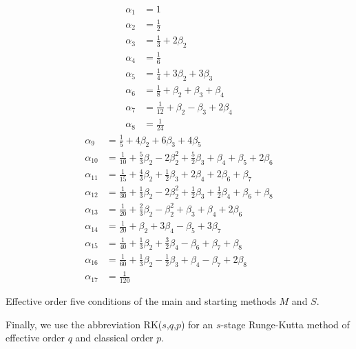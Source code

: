 \begin{table}
	\begin{multicols}{2}
		\begin{align*}
    		\alpha_1  &= 1 \\
     		\alpha_2  &= \tfrac{1}{2} \\
    		\alpha_3  &= \tfrac{1}{3} + 2\beta_2 \\
    		\alpha_4  &= \tfrac{1}{6} \\
    		\alpha_5  &= \tfrac{1}{4} + 3\beta_2 + 3\beta_3 \\
    		\alpha_6  &= \tfrac{1}{8} + \beta_2 + \beta_3 + \beta_4 \\
    		\alpha_7  &= \tfrac{1}{12} +\beta_2 - \beta_3 + 2\beta_4 \\
    		\alpha_8  &= \tfrac{1}{24}
    	\end{align*}
    	\vfill
    	\columnbreak
    	\begin{align*}
    		\alpha_9  &= \tfrac{1}{5} + 4\beta_2 + 6\beta_3 + 4\beta_5 \\
    		\alpha_{10} &= \tfrac{1}{10} + \tfrac{5}{3}\beta_2 - 2\beta_2^{2} + \tfrac{5}{2}\beta_3 + \beta_4 + \beta_5 + 2\beta_6 \\
    		\alpha_{11} &= \tfrac{1}{15} + \tfrac{4}{3}\beta_2 + \tfrac{1}{2}\beta_3 + 2\beta_4 + 2\beta_6 + \beta_7 \\
    		\alpha_{12} &= \tfrac{1}{30} + \tfrac{1}{3}\beta_2 - 2\beta_2^{2} + \tfrac{1}{2}\beta_3 + \tfrac{1}{2}\beta_4 + \beta_6 + \beta_8 \\
    		\alpha_{13} &= \tfrac{1}{20} + \tfrac{2}{3}\beta_2 - \beta_2^{2} + \beta_3 + \beta_4 + 2\beta_6 \\
    		\alpha_{14} &= \tfrac{1}{20} + \beta_2 + 3\beta_4 - \beta_5 + 3\beta_7 \\
    		\alpha_{15} &= \tfrac{1}{40} + \tfrac{1}{3}\beta_2 + \tfrac{3}{2}\beta_4 - \beta_6 + \beta_7 + \beta_8 \\
    		\alpha_{16} &= \tfrac{1}{60} + \tfrac{1}{3}\beta_2 - \tfrac{1}{2}\beta_3 + \beta_4 - \beta_7 + 2\beta_8 \\
    		\alpha_{17} &= \tfrac{1}{120}
    	\end{align*}
        \vfill
    \end{multicols}
    \caption{Effective order five conditions of the main and starting methods $M$ and $S$.}
    \label{tab:effective_OCs_on_alpha}
\end{table}
Finally, we use the abbreviation RK($s$,$q$,$p$) for an $s$-stage Runge-Kutta method of effective order $q$ and classical order $p$.


